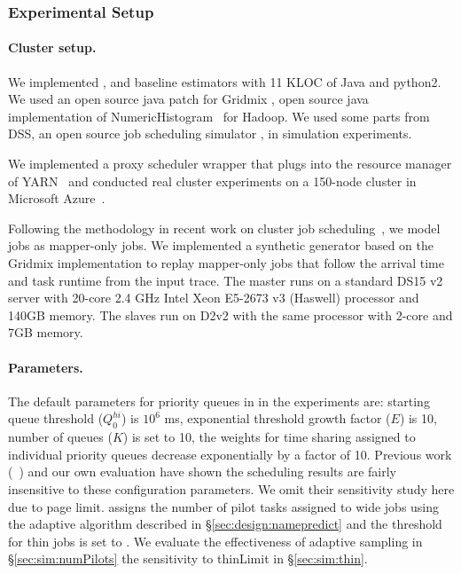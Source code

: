 \subsubsection{Experimental Setup}
\label{sec:sim:setup}

\paragraph{Cluster setup.}
We implemented \gs, \slearn and baseline estimators with 11 KLOC of Java
and python2. We used an open source java patch for Gridmix
\cite{gridmixpatch:junwoo}, open source java implementation of
NumericHistogram~\cite{numericHistogramJavaPatch} for Hadoop. We used some
parts from DSS, an open source job scheduling simulator \cite{dssScheduler}, in
simulation experiments.

We implemented a proxy scheduler wrapper that plugs into the resource
manager of YARN~\cite{yarn:web} and conducted real cluster experiments
on a 150-node cluster in Microsoft Azure~\cite{azure:web}.

Following the methodology in recent work on cluster job
scheduling~\cite{3Sigma,jamiasvu,stratus:socc2018}, we model jobs as
mapper-only jobs. We implemented a synthetic generator based on the Gridmix
implementation to replay mapper-only jobs that follow the arrival time and task
runtime from the input trace. The master runs on a standard DS15 v2 server with
20-core 2.4 GHz Intel Xeon E5-2673 v3 (Haswell) processor and 140GB memory. The
slaves run on D2v2 with the same processor with 2-core and 7GB memory.

\paragraph{Parameters.}
The {default parameters} for priority queues in \gs in the experiments
are: starting queue threshold ($Q^{hi}_0$) is $10^6$ ms, exponential threshold
growth factor ($E$) is 10, number of queues ($K$) is set to 10, the weights for
time sharing assigned to individual priority queues decrease exponentially by a
factor of 10.
Previous work (\eg~\cite{aalo:sigcomm15}) and our own evaluation have shown the
scheduling results are fairly insensitive to these configuration parameters. We
omit their sensitivity study here due to page limit.
\slearn assigns the number of pilot tasks assigned to wide jobs using
the adaptive algorithm described in \S\ref{sec:design:namepredict}
and the threshold for thin jobs is set to \thinLimit.
We evaluate the effectiveness of adaptive sampling
in \S\ref{sec:sim:numPilots} the sensitivity to thinLimit in \S\ref{sec:sim:thin}.

